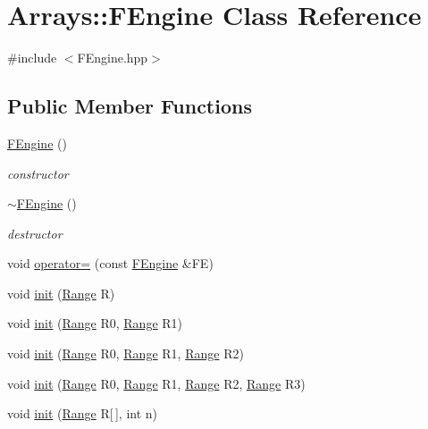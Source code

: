 \hypertarget{classArrays_1_1FEngine}{}\section{Arrays\+:\+:F\+Engine Class Reference}
\label{classArrays_1_1FEngine}


{\ttfamily \#include $<$F\+Engine.\+hpp$>$}

\subsection*{Public Member Functions}
\begin{DoxyCompactItemize}
\item 
\hyperlink{classArrays_1_1FEngine_a9c234babc4416e5dcfc467a32a520509}{F\+Engine} ()
\begin{DoxyCompactList}\small\item\em constructor \end{DoxyCompactList}\item 
\hyperlink{classArrays_1_1FEngine_a2905fdfb09ac7e5c31ec679756303b34}{$\sim$\+F\+Engine} ()
\begin{DoxyCompactList}\small\item\em destructor \end{DoxyCompactList}\item 
void \hyperlink{classArrays_1_1FEngine_a5a72986852a90f4661a3fbe3cdcabda3}{operator=} (const \hyperlink{classArrays_1_1FEngine}{F\+Engine} \&F\+E)
\item 
void \hyperlink{classArrays_1_1FEngine_ab2eb2c10e789bd7b61d94b87ae10a7cb}{init} (\hyperlink{structArrays_1_1Range}{Range} R)
\item 
void \hyperlink{classArrays_1_1FEngine_a13213addb5d54e4f4df925f036d5fa1a}{init} (\hyperlink{structArrays_1_1Range}{Range} R0, \hyperlink{structArrays_1_1Range}{Range} R1)
\item 
void \hyperlink{classArrays_1_1FEngine_aa3c5e7c09c618b8a9842a7ee4f514dcd}{init} (\hyperlink{structArrays_1_1Range}{Range} R0, \hyperlink{structArrays_1_1Range}{Range} R1, \hyperlink{structArrays_1_1Range}{Range} R2)
\item 
void \hyperlink{classArrays_1_1FEngine_ad65e8e153b3467f57081f23050b6e32a}{init} (\hyperlink{structArrays_1_1Range}{Range} R0, \hyperlink{structArrays_1_1Range}{Range} R1, \hyperlink{structArrays_1_1Range}{Range} R2, \hyperlink{structArrays_1_1Range}{Range} R3)
\item 
void \hyperlink{classArrays_1_1FEngine_a4712bf78ad34f1d29d34425b902cdb16}{init} (\hyperlink{structArrays_1_1Range}{Range} R\mbox{[}$\,$\mbox{]}, int n)

\end{DoxyCompactItemize}
